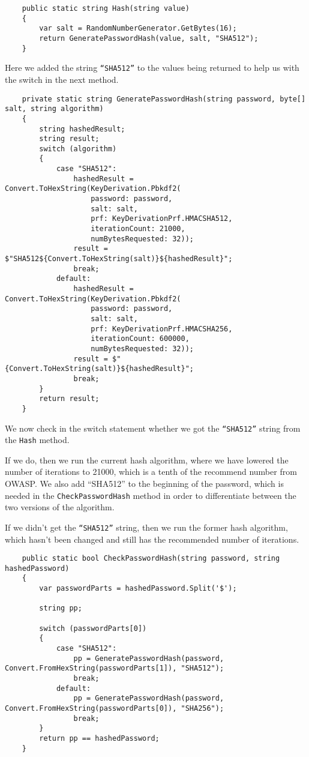 \begin{verbatim}
    public static string Hash(string value)
    {
        var salt = RandomNumberGenerator.GetBytes(16);
        return GeneratePasswordHash(value, salt, "SHA512");
    }
\end{verbatim}

Here we added the string \texttt{“SHA512”} to the values being returned to help us with the switch in the next method.

\begin{verbatim}
    private static string GeneratePasswordHash(string password, byte[] salt, string algorithm)
    {
        string hashedResult;
        string result;
        switch (algorithm)
        {
            case "SHA512":
                hashedResult = Convert.ToHexString(KeyDerivation.Pbkdf2(
                    password: password,
                    salt: salt,
                    prf: KeyDerivationPrf.HMACSHA512,
                    iterationCount: 21000,
                    numBytesRequested: 32));
                result = $"SHA512${Convert.ToHexString(salt)}${hashedResult}";
                break;
            default:
                hashedResult = Convert.ToHexString(KeyDerivation.Pbkdf2(
                    password: password,
                    salt: salt,
                    prf: KeyDerivationPrf.HMACSHA256,
                    iterationCount: 600000,
                    numBytesRequested: 32));
                result = $"{Convert.ToHexString(salt)}${hashedResult}";
                break;
        }
        return result;
    }
\end{verbatim}

We now check in the switch statement whether we got the \texttt{“SHA512”} string from the \texttt{Hash} method.

If we do, then we run the current hash algorithm, where we have lowered the number of iterations to 21000, which is a tenth of the recommend number from OWASP. We also add ``SHA512'' to the beginning of the password, which is needed in the \texttt{CheckPasswordHash} method in order to differentiate between the two versions of the algorithm.

If we didn't get the \texttt{“SHA512”} string, then we run the former hash algorithm, which hasn't been changed and still has the recommended number of iterations.

\begin{verbatim}
    public static bool CheckPasswordHash(string password, string hashedPassword)
    {
        var passwordParts = hashedPassword.Split('$');

        string pp;

        switch (passwordParts[0])
        {
            case "SHA512":
                pp = GeneratePasswordHash(password, Convert.FromHexString(passwordParts[1]), "SHA512");
                break;
            default:
                pp = GeneratePasswordHash(password, Convert.FromHexString(passwordParts[0]), "SHA256");
                break;
        }
        return pp == hashedPassword;
    }
\end{verbatim}

